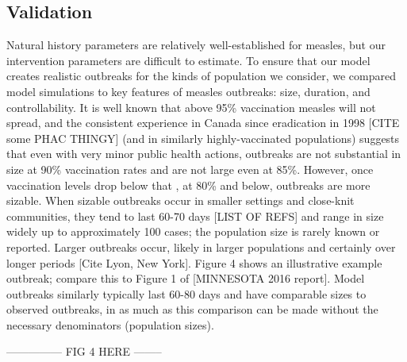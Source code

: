 \documentclass[12pt,a4paper]{article}
\begin{document}
\subsection{Validation}
Natural history parameters are relatively well-established for measles, but our intervention parameters are difficult to estimate. To ensure that our model creates realistic outbreaks for the kinds of population we consider, we compared model simulations to key features of measles outbreaks: size, duration, and controllability. It is well known that above 95\% vaccination measles will not spread, and the consistent experience in Canada since eradication in 1998 [CITE some PHAC THINGY] (and in similarly highly-vaccinated populations) suggests that even with very minor public health actions, outbreaks are not substantial in size at 90\% vaccination rates and are not large even at 85\%. However, once vaccination levels drop below that , at 80\% and below, outbreaks are more sizable. When sizable outbreaks occur in smaller settings and close-knit communities, they tend to last 60-70 days [LIST OF REFS] and range in size widely up to approximately 100 cases; the population size is rarely known or reported. Larger outbreaks occur, likely in larger populations and certainly over longer periods [Cite Lyon, New York].
Figure 4 shows an illustrative example outbreak; compare this to Figure 1 of [MINNESOTA 2016 report].
Model outbreaks similarly typically last 60-80 days and have comparable sizes to observed outbreaks, in as much as this comparison can be made without the necessary denominators (population sizes).

--------------- FIG 4 HERE --------
\end{document}
